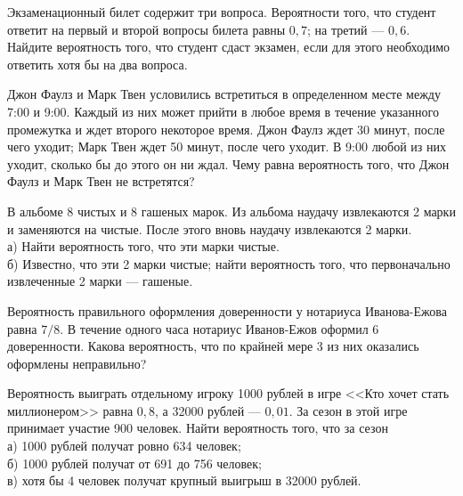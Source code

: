\newpage\setcounter{zad}{0}



\begin{zkrW}{20}\noindent 
	Экзаменационный билет содержит три вопроса. Вероятности того, что студент ответит на первый и второй вопросы билета равны $0{,}7$; на третий --- $0{,}6$. Найдите вероятность того, что студент сдаст экзамен, если для этого необходимо ответить хотя бы на два вопроса.
 
\end{zkrW}

\begin{zkrW}{20}\noindent 
	Джон Фаулз и Марк Твен условились встретиться в определенном месте между 7:00 и 9:00. Каждый из них может прийти в любое время в течение указанного промежутка и ждет второго некоторое время. Джон Фаулз ждет 30 минут, после чего уходит; Марк Твен ждет 50 минут, после чего уходит. В 9:00 любой из них уходит, сколько бы до этого он ни ждал. Чему равна вероятность того, что Джон Фаулз и Марк Твен не встретятся?
 
\end{zkrW}

\begin{zkrW}{20}\noindent 
	В альбоме 8 чистых и 8 гашеных марок. Из альбома наудачу извлекаются 2 марки и заменяются на чистые. После этого вновь наудачу извлекаются 2 марки. \\ \indent а) Найти вероятность того, что эти марки чистые. \\ \indent б) Известно, что эти 2 марки чистые; найти вероятность того, что первоначально извлеченные 2 марки --- гашеные.
 
\end{zkrW}

\begin{zkrW}{20}\noindent 
	Вероятность правильного оформления доверенности у нотариуса Иванова-Ежова равна $7/8$. В течение одного часа нотариус Иванов-Ежов оформил 6 доверенности. Какова вероятность, что по крайней мере 3 из них оказались оформлены неправильно?
 
\end{zkrW}

\begin{zkrW}{20}\noindent 
	Вероятность выиграть отдельному игроку 1000 рублей в игре <<Кто хочет стать миллионером>> равна $0{,}8$, а 32000 рублей --- $0{,}01$. За сезон в этой игре принимает участие 900 человек. Найти вероятность того, что за сезон \\ \indent а) 1000 рублей получат ровно 634 человек; \\ \indent б) 1000 рублей получат от 691 до 756 человек; \\ \indent в) хотя бы 4 человек получат крупный выигрыш в 32000 рублей.
 
\end{zkrW}

